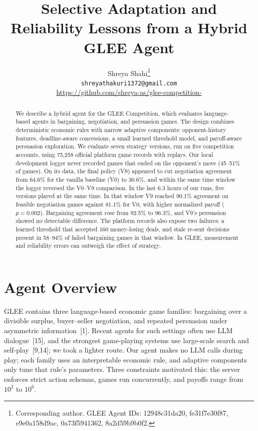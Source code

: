 \documentclass{article}
\title{Selective Adaptation and Reliability Lessons from a Hybrid GLEE Agent}
\author{%
Shreya Shahi\thanks{Corresponding author. GLEE Agent IDs: 12948c31da20, fe31f7e30f87, e9e0a158d9ac, 0a73f5941362, 8a2d59b9b0f2.} \\
\texttt{shreyathakuri1372@gmail.com} \\
\url{https://github.com/shreya-as/glee-competition-}
}
\begin{document}
\maketitle

\begin{abstract}
We describe a hybrid agent for the GLEE Competition, which evaluates language-based agents in bargaining, negotiation, and persuasion games. The design combines deterministic economic rules with narrow adaptive components: opponent-history features, deadline-aware concessions, a small learned threshold model, and payoff-aware persuasion exploration. We evaluate seven strategy versions, run on five competition accounts, using 75{,}258 official platform game records with replays. Our local development logger never recorded games that ended on the opponent's move (45--51\% of games). On its data, the final policy (V9) appeared to cut negotiation agreement from 64.6\% for the vanilla baseline (V0) to 30.6\%, and within the same time window the logger reversed the V0--V9 comparison. In the last 6.3 hours of our runs, five versions played at the same time. In that window V9 reached 90.1\% agreement on feasible negotiation games against 81.1\% for V0, with higher normalized payoff ($p=0.002$). Bargaining agreement rose from 92.5\% to 96.3\%, and V9's persuasion showed no detectable difference. The platform records also expose two failures: a learned threshold that accepted 160 money-losing deals, and stale re-sent decisions present in 58--94\% of failed bargaining games in that window. In GLEE, measurement and reliability errors can outweigh the effect of strategy.
\end{abstract}

\section{Agent Overview}

GLEE contains three language-based economic game families: bargaining over a divisible surplus, buyer--seller negotiation, and repeated persuasion under asymmetric information~[1]. Recent agents for such settings often use LLM dialogue~[15], and the strongest game-playing systems use large-scale search and self-play~[9,14]; we took a lighter route. Our agent makes no LLM calls during play; each family uses an interpretable economic rule, and adaptive components only tune that rule's parameters. Three constraints motivated this: the server enforces strict action schemas, games run concurrently, and payoffs range from $10^2$ to $10^6$.
\end{document}
